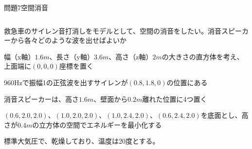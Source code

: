 \documentclass[dvipdfmx]{beamer}
\newenvironment{wideitemize}{\itemize\setlength{\itemsep}{1em}}{\enditemize}
\newenvironment{wideitemize2}{\itemize\setlength{\itemsep}{0.2em}}{\enditemize}
\begin{document}

\begin{frame}{問題7}{空間消音}
\begin{columns}[t]
\begin{column}{0.7\textwidth}
\begin{wideitemize}
	\item 救急車のサイレン音打消しをモデルとして、空間の消音をしたい。消音スピーカーから各々どのような波を出せばよいか
	\begin{wideitemize2}
		\item 幅（x軸）$1.6m$、長さ（y軸）$3.6m$、高さ（z軸）$2m$の大きさの直方体を考え、上面端に$(0, 0, 0)$座標を置く
		\item 960Hzで振幅1の正弦波を出すサイレンが$(0.8,1.8,0)$の位置にある
		\item 消音スピーカーは、高さ$1.6m$、壁面から$0.2m$離れた位置に4つ置く
		\item $(0.6, 2.0, 2.0)$、$(1.0, 2.0, 2.0)$、$(1.0, 2.4, 2.0)$、$(0.6, 2.4, 2.0)$を底面とし、高さが$0.4m$の立方体の空間でエネルギーを最小化する
		\item 標準大気圧で、乾燥しており、温度は20度とする。
	\end{wideitemize2}

\end{wideitemize}


\end{column}
\end{columns}
\end{frame}
\end{document}
